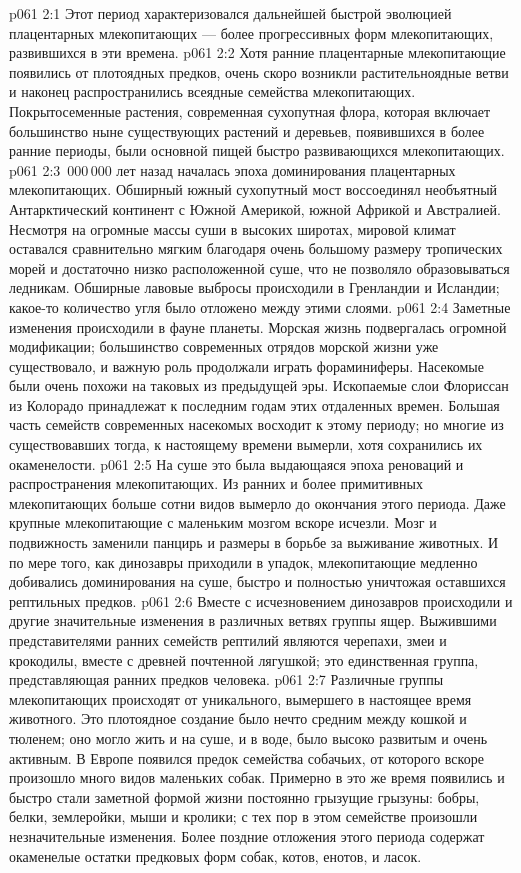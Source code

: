 \vs p061 2:1 Этот период характеризовался дальнейшей быстрой эволюцией плацентарных млекопитающих --- более прогрессивных форм млекопитающих, развившихся в эти времена.
\vs p061 2:2 Хотя ранние плацентарные млекопитающие появились от плотоядных предков, очень скоро возникли растительноядные ветви и наконец распространились всеядные семейства млекопитающих. Покрытосеменные растения, современная сухопутная флора, которая включает большинство ныне существующих растений и деревьев, появившихся в более ранние периоды, были основной пищей быстро развивающихся млекопитающих.
\vs p061 2:3 \,000\,000 лет назад началась эпоха доминирования плацентарных млекопитающих. Обширный южный сухопутный мост воссоединял необъятный Антарктический континент с Южной Америкой, южной Африкой и Австралией. Несмотря на огромные массы суши в высоких широтах, мировой климат оставался сравнительно мягким благодаря очень большому размеру тропических морей и достаточно низко расположенной суше, что не позволяло образовываться ледникам. Обширные лавовые выбросы происходили в Гренландии и Исландии; какое\hyp{}то количество угля было отложено между этими слоями.
\vs p061 2:4 Заметные изменения происходили в фауне планеты. Морская жизнь подвергалась огромной модификации; большинство современных отрядов морской жизни уже существовало, и важную роль продолжали играть фораминиферы. Насекомые были очень похожи на таковых из предыдущей эры. Ископаемые слои Флориссан из Колорадо принадлежат к последним годам этих отдаленных времен. Большая часть семейств современных насекомых восходит к этому периоду; но многие из существовавших тогда, к настоящему времени вымерли, хотя сохранились их окаменелости.
\vs p061 2:5 На суше это была выдающаяся эпоха реноваций и распространения млекопитающих. Из ранних и более примитивных млекопитающих больше сотни видов вымерло до окончания этого периода. Даже крупные млекопитающие с маленьким мозгом вскоре исчезли. Мозг и подвижность заменили панцирь и размеры в борьбе за выживание животных. И по мере того, как динозавры приходили в упадок, млекопитающие медленно добивались доминирования на суше, быстро и полностью уничтожая оставшихся рептильных предков.
\vs p061 2:6 Вместе с исчезновением динозавров происходили и другие значительные изменения в различных ветвях группы ящер. Выжившими представителями ранних семейств рептилий являются черепахи, змеи и крокодилы, вместе с древней почтенной лягушкой; это единственная группа, представляющая ранних предков человека.
\vs p061 2:7 Различные группы млекопитающих происходят от уникального, вымершего в настоящее время животного. Это плотоядное создание было нечто средним между кошкой и тюленем; оно могло жить и на суше, и в воде, было высоко развитым и очень активным. В Европе появился предок семейства собачьих, от которого вскоре произошло много видов маленьких собак. Примерно в это же время появились и быстро стали заметной формой жизни постоянно грызущие грызуны: бобры, белки, землеройки, мыши и кролики; с тех пор в этом семействе произошли незначительные изменения. Более поздние отложения этого периода содержат окаменелые остатки предковых форм собак, котов, енотов, и ласок.
